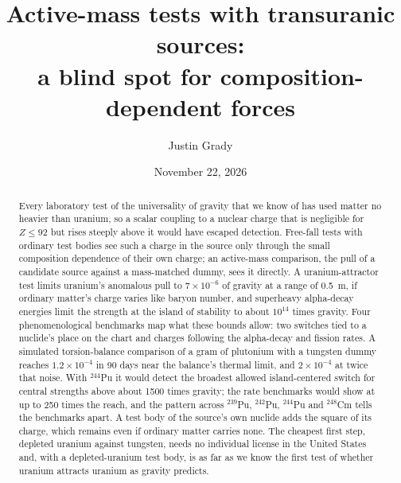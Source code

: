 \documentclass[aps,prd,onecolumn,superscriptaddress,floatfix,nofootinbib]{revtex4-2}
\newcommand{\Pu}[1]{$^{#1}$Pu}
\newcommand{\nuc}[2]{$^{#1}$#2}
\begin{document}
\raggedbottom

\title{Active-mass tests with transuranic sources:\texorpdfstring{\\}{ } a blind spot for composition-dependent forces}

\author{Justin Grady}

\date{November 22, 2026}

\begin{abstract}
Every laboratory test of the universality of gravity that we know of has used matter no heavier than uranium, so a scalar coupling to a nuclear charge that is negligible for $Z\le92$ but rises steeply above it would
have escaped detection. Free-fall tests with ordinary test bodies see such a charge in the source only through the
small composition dependence of their own charge; an active-mass comparison, the pull of a candidate source against a
mass-matched dummy, sees it directly. A uranium-attractor test limits uranium's anomalous pull to $7\times10^{-6}$ of
gravity at a range of 0.5~m, if ordinary matter's charge varies like baryon number, and superheavy alpha-decay
energies limit the strength at the island of stability to about $10^{14}$ times gravity. Four phenomenological
benchmarks map what these bounds allow: two switches tied to a nuclide's place on the chart and charges following
the alpha-decay and fission rates. A simulated torsion-balance comparison of a gram of plutonium with a tungsten
dummy reaches $1.2\times10^{-4}$ in 90 days near the balance's thermal limit, and $2\times10^{-4}$ at twice that noise. With \Pu{244} it would detect the broadest allowed island-centered
switch for central strengths above about 1500 times gravity; the rate benchmarks would show at up to 250 times the
reach, and the pattern across \Pu{239}, \Pu{242}, \Pu{244} and \nuc{248}{Cm} tells the
benchmarks apart. A test body of the source's own nuclide adds
the square of its charge, which remains even if ordinary matter carries none. The cheapest first step, depleted
uranium against tungsten, needs no individual license in the United States and, with a depleted-uranium test body, is
as far as we know the first test of whether uranium attracts uranium as gravity predicts.
\end{abstract}

\maketitle
\end{document}
